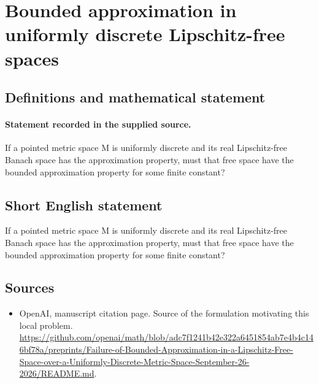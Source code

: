 \documentclass[11pt]{article}
\begin{document}
\section*{Bounded approximation in uniformly discrete Lipschitz-free spaces}\label{30007188}
\subsection{Definitions and mathematical statement}
\paragraph{Statement recorded in the supplied source.}
If a pointed metric space M is uniformly discrete and its real Lipschitz-free Banach space has the approximation property, must that free space have the bounded approximation property for some finite constant?
\subsection{Short English statement}
If a pointed metric space M is uniformly discrete and its real Lipschitz-free Banach space has the approximation property, must that free space have the bounded approximation property for some finite constant?
\subsection{Sources}
\begin{itemize}
\item[S1] OpenAI, manuscript citation page. Source of the formulation motivating this local problem.
\url{https://github.com/openai/math/blob/adc7f1241b42e322a6451854ab7e4b4c146bf78a/preprints/Failure-of-Bounded-Approximation-in-a-Lipschitz-Free-Space-over-a-Uniformly-Discrete-Metric-Space-September-26-2026/README.md}.
\end{itemize}
\end{document}
